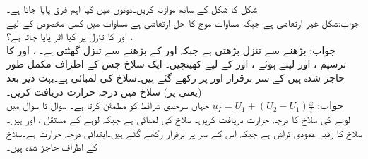 

\quad 
شکل   کا شکل  کے ساتھ موازنہ کریں۔دونوں میں کیا اہم فرق پایا جاتا ہے۔\\
جواب:\quad شکل  غیر ارتعاشی ہے جبکہ مساوات موج کا حل ارتعاشی ہے
 \quad 
مساوات  میں کسی مخصوص  کے لیے ،  اور  کا تنزل پر کیا اثر پایا جاتا ہے؟\\
جواب:\quad {} بڑھنے سے تنزل بڑھتی ہے جبکہ  اور  کے بڑھنے سے تنزل گھٹتی ہے۔
 \quad 
{}،  اور  کا ترسیم  ،  اور  لیتے ہوئے ،  اور  کے لیے کھینچیں۔
\quad
ایک سلاخ جس کے اطراف مکمل طور حاجز شدہ ہیں  کے سر برقرار  اور  پر رکھے گئے ہیں۔سلاخ کی لمبائی  ہے۔بہت دیر بعد (یعنی  پر) سلاخ میں درجہ حرارت  دریافت کریں۔ \\
جواب:\quad
$u_I=U_1+(U_2-U_1)\tfrac{x}{l}$
جہاں  سرحدی شرائط کو مطمئن کرتا ہے۔
سوال  تا سوال  میں لوہے کی سلاخ کا درجہ حرارت  دریافت کریں۔ سلاخ کی لمبائی  ہے جبکہ لوہے کے مستقل ،  اور  ہیں۔ سلاخ کا رقبہ عمودی تراش  ہے جبکہ اس کے سر  پر برقرار رکھے گئے ہیں۔ابتدائی درجہ حرارت  ہے۔سلاخ کے اطراف حاجز شدہ ہیں۔


